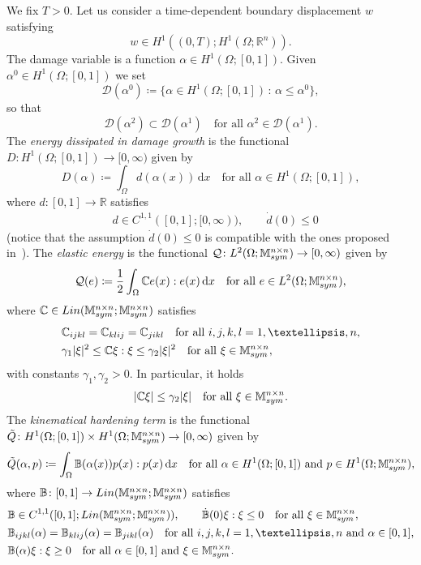 \documentclass[reqno]{amsart}
\theoremstyle{definition}
\numberwithin{equation}{section}
\def\Lin {\mathop {\rm Lin}\nolimits}
\def\de {\mathrm{d}}
\def\R {\mathbb R}
\def\M {\mathbb M^{n\times n}_{\rm sym}}
\def\C {\mathbb C}
\def\B {\mathbb B}
\begin{document}
We fix $T>0$. Let us consider a time-dependent boundary displacement $w$ satisfying
\begin{equation}\label{eq:w}
w\in H^1((0,T);H^1(\Omega;\R^n)).
\end{equation}
The damage variable is a function $\alpha\in H^1(\Omega;[0,1])$. Given $\alpha^0\in H^1(\Omega;[0,1])$ we set
\begin{equation*}
\mathcal D(\alpha^0)\coloneqq \{\alpha\in H^1(\Omega;[0,1])\,:\,\alpha\le \alpha^0\},
\end{equation*}
so that 
\begin{equation*}
\mathcal D(\alpha^2)\subset \mathcal D(\alpha^1)\quad\text{for all $\alpha^2\in\mathcal D(\alpha^1)$}.
\end{equation*}
The {\it energy dissipated in damage growth} is the functional $D\colon H^1(\Omega;[0,1])\to [0,\infty)$ given by
\begin{equation*}
D(\alpha)\coloneqq \int_\Omega d(\alpha(x)) \,\de x\quad\text{for all $\alpha\in H^1(\Omega;[0,1])$},
\end{equation*}
where $d\colon [0,1]\to\R$ satisfies
\begin{align}
&d\in C^{1,1}([0,1];[0,\infty)),\qquad \dot d(0)\le 0\label{eq:d}
\end{align}
(notice that the assumption $\dot d(0)\le 0$ is compatible with the ones proposed in~\cite{KazMar18}).
The {\it elastic energy} is the functional $\mathcal Q\colon L^2(\Omega;\M)\to [0,\infty)$ given by
\begin{equation*}
\mathcal Q(e)\coloneqq \frac{1}{2}\int_\Omega\C e(x):e(x) \,\de x\quad\text{for all $e\in L^2(\Omega;\M)$},
\end{equation*}
where $\C\in \Lin(\M;\M)$ satisfies
\begin{align}
&\C_{ijkl}=\C_{klij}=\C_{jikl}\quad\text{for all $i,j,k,l=1,\dots,n$},\label{eq:C1}\\
&\gamma_1|\xi|^2\le \C\xi:\xi\le\gamma_2|\xi|^2\quad\text{for all $\xi\in\M$},\label{eq:C2}
\end{align}
with constants $\gamma_1,\gamma_2>0$. In particular, it holds
\begin{equation*}
|\C\xi|\le \gamma_2 |\xi|\quad\text{for all $\xi\in\M$}.
\end{equation*}
The {\it kinematical hardening term} is the functional $\tilde Q\colon H^1(\Omega;[0,1])\times H^1(\Omega;\M)\to [0,\infty)$ given by
\begin{equation*}
\tilde Q(\alpha,p)\coloneqq \int_\Omega \B(\alpha(x))p(x):p(x) \,\de x\quad\text{for all $\alpha\in H^1(\Omega;[0,1])$ and $p\in H^1(\Omega;\M)$},
\end{equation*}
where $\B\colon [0,1]\to \Lin(\M;\M)$ satisfies
\begin{align}
&\B\in C^{1,1}([0,1];\Lin(\M;\M)),\qquad \dot{\B}(0)\xi:\xi\le 0\quad\text{for all $\xi\in\M$},\label{eq:B1}\\
&\B_{ijkl}(\alpha)=\B_{klij}(\alpha)=\B_{jikl}(\alpha)\quad\text{for all $i,j,k,l=1,\dots,n$ and $\alpha\in [0,1]$},\label{eq:B2}\\
&\B(\alpha)\xi:\xi\ge 0\quad\text{for all $\alpha\in[0,1]$ and $\xi\in\M$}.\label{eq:B3}
\end{align}
\end{document}
